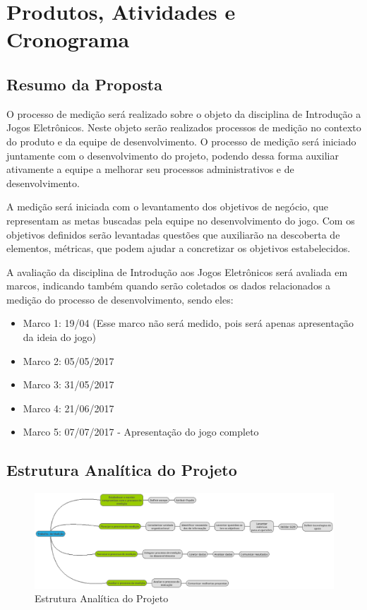 \chapter{Produtos, Atividades e Cronograma}

\section{Resumo da Proposta}
	O processo de medição será realizado sobre o objeto da disciplina de Introdução a Jogos Eletrônicos. Neste objeto serão realizados processos de medição no contexto do produto e da equipe de desenvolvimento. O processo de medição será iniciado juntamente com o desenvolvimento do projeto, podendo dessa forma auxiliar ativamente a equipe a melhorar seu processos administrativos e de desenvolvimento.
	
	A medição será iniciada com o levantamento dos objetivos de negócio, que representam as metas buscadas pela equipe no desenvolvimento do jogo. Com os objetivos definidos serão levantadas questões que auxiliarão na descoberta de elementos, métricas, que podem ajudar a concretizar os objetivos estabelecidos.

	A avaliação da disciplina de Introdução aos Jogos Eletrônicos será avaliada em marcos, indicando também quando serão coletados os dados relacionados a medição do processo de desenvolvimento, sendo eles:

	\begin{itemize}
		\item Marco 1: 19/04 (Esse marco não será medido, pois será apenas apresentação da ideia do jogo)
		\item Marco 2: 05/05/2017
		\item Marco 3: 31/05/2017
		\item Marco 4: 21/06/2017
		\item Marco 5: 07/07/2017 - Apresentação do jogo completo
	\end{itemize}

\newpage

\section{Estrutura Analítica do Projeto}
	\begin{figure}[!htpb]
		\centering
		\includegraphics [scale=0.42]{figuras/processo/eap}
		\caption{Estrutura Analítica do Projeto}
	\end{figure}
	
